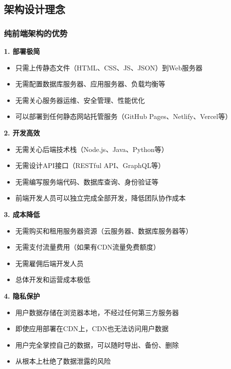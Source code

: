 \documentclass[12pt,a4paper]{article}
\begin{document}
\subsection{架构设计理念}

\subsubsection{纯前端架构的优势}

\textbf{1. 部署极简}
\begin{itemize}
    \item 只需上传静态文件（HTML、CSS、JS、JSON）到Web服务器
    \item 无需配置数据库服务器、应用服务器、负载均衡等
    \item 无需关心服务器运维、安全管理、性能优化
    \item 可以部署到任何静态网站托管服务（GitHub Pages、Netlify、Vercel等）
\end{itemize}

\textbf{2. 开发高效}
\begin{itemize}
    \item 无需关心后端技术栈（Node.js、Java、Python等）
    \item 无需设计API接口（RESTful API、GraphQL等）
    \item 无需编写服务端代码、数据库查询、身份验证等
    \item 前端开发人员可以独立完成全部开发，降低团队协作成本
\end{itemize}

\textbf{3. 成本降低}
\begin{itemize}
    \item 无需购买和租用服务器资源（云服务器、数据库服务器等）
    \item 无需支付流量费用（如果有CDN流量免费额度）
    \item 无需雇佣后端开发人员
    \item 总体开发和运营成本极低
\end{itemize}

\textbf{4. 隐私保护}
\begin{itemize}
    \item 用户数据存储在浏览器本地，不经过任何第三方服务器
    \item 即使应用部署在CDN上，CDN也无法访问用户数据
    \item 用户完全掌控自己的数据，可以随时导出、备份、删除
    \item 从根本上杜绝了数据泄露的风险
\end{itemize}
\end{document}
